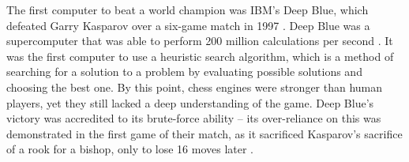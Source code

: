 \documentclass[%
 superscriptaddress,
showpacs,preprintnumbers,
 amsmath,
 amssymb,
 aps,
 pra,
showkeys,
onecolumn,
notitlepage,
11pt,
tightenlines      %
]{revtex4-1}
\begin{document}
The first computer to beat a world champion was IBM's Deep Blue, which defeated Garry Kasparov over a six-game match in 1997 \cite{seirawan1997implications}. Deep Blue was a supercomputer that was able to perform 200 million calculations per second \cite{strogatz2018one}. It was the first computer to use a heuristic search algorithm, which is a method of searching for a solution to a problem by evaluating possible solutions and choosing the best one. By this point, chess engines were stronger than human players, yet they still lacked a deep understanding of the game. Deep Blue's victory was accredited to its brute-force ability -- its over-reliance on this was demonstrated in the first game of their match, as it sacrificed Kasparov's sacrifice of a rook for a bishop, only to lose 16 moves later \cite{strogatz2018one}.
\end{document}
